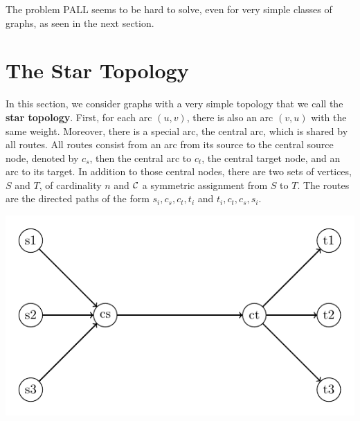 \documentclass[a4paper,10pt]{article}
\begin{document}
    
    The problem PALL seems to be hard to solve, even for very simple classes of graphs, as seen in the next section.
    
\section{The Star Topology}
  
   
    
      In this section, we consider graphs with a very simple topology that we call the {\bf star topology}. 
      First, for each arc $(u,v)$, there is also an arc $(v,u)$ with the same weight.
      Moreover, there is a special arc, the central arc, which is shared by all routes.
      All routes consist from an arc from its source to the central source node, denoted by {\bf $c_s$},
      then the central arc to {\bf $c_t$}, the central target node, and an arc to its target. In addition to those central nodes, there are two sets of vertices, $S$ and $T$, of cardinality $n$ and ${\cal C}$ a symmetric assignment from $S$ to $T$. 
      The routes are the directed paths of the form $s_i,c_s,c_t,t_i$ and $t_i,c_t,c_s,s_i$. 
      
      
       \begin{center}
	  \includegraphics[scale=0.8]{Fig4.pdf}
	\end{center}
	
\end{document}
